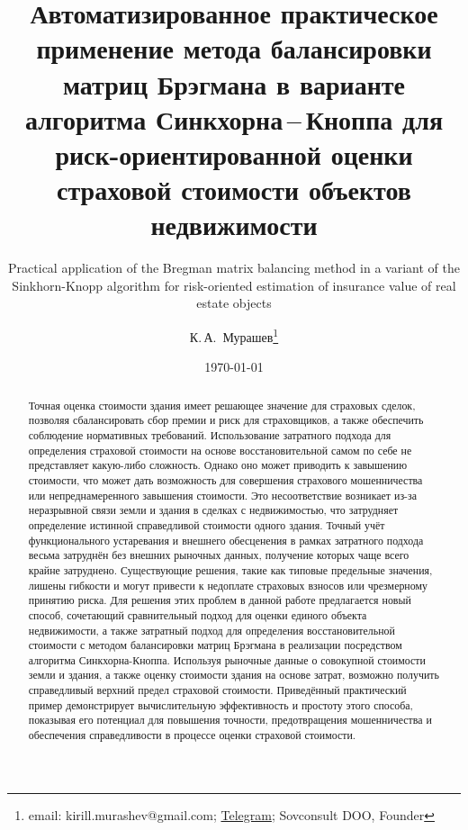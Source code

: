 \documentclass[12pt]{scrartcl}
\title{Автоматизированное практическое применение метода балансировки матриц Брэгмана в варианте алгоритма Синкхорна\,--\,Кноппа для риск-ориентированной оценки страховой стоимости объектов недвижимости}
\subtitle{\foreignlanguage{english}{Practical application of the Bregman matrix balancing method in a variant of the Sinkhorn-Knopp algorithm for risk-oriented estimation of insurance value of real estate objects}}
\author{К.\,А.~Мурашев\thanks{email: kirill.murashev@gmail.com; \href{https://t.me/AIinValuation}{Telegram}; Sovconsult DOO, Founder}}
\date{\today}
\begin{document}
\maketitle

\begin{abstract}
Точная оценка стоимости здания имеет решающее значение для страховых сделок, позволяя сбалансировать сбор премии и риск для страховщиков, а также обеспечить соблюдение нормативных требований. Использование затратного подхода для определения страховой стоимости на основе восстановительной самом по себе не представляет какую-либо сложность. Однако оно может приводить к завышению стоимости, что может дать возможность для совершения страхового мошенничества или непреднамеренного завышения стоимости. Это несоответствие возникает из-за неразрывной связи земли и здания в сделках с недвижимостью, что затрудняет определение истинной справедливой стоимости одного здания. Точный учёт функционального устаревания и внешнего обесценения в рамках затратного подхода весьма затруднён без внешних рыночных данных, получение которых чаще всего крайне затруднено. Существующие решения, такие как типовые предельные значения, лишены гибкости и могут привести к недоплате страховых взносов или чрезмерному принятию риска. Для решения этих проблем в данной работе предлагается новый способ, сочетающий сравнительный подход для оценки единого объекта недвижимости, а также затратный подход для определения восстановительной стоимости с методом балансировки матриц Брэгмана в реализации посредством алгоритма Синкхорна-Кноппа. Используя рыночные данные о совокупной стоимости земли и здания, а также оценку стоимости здания на основе затрат, возможно получить справедливый верхний предел страховой стоимости. Приведённый практический пример демонстрирует вычислительную эффективность и простоту этого способа, показывая его потенциал для повышения точности, предотвращения мошенничества и обеспечения справедливости в процессе оценки страховой стоимости.



\end{abstract}
\end{document}
